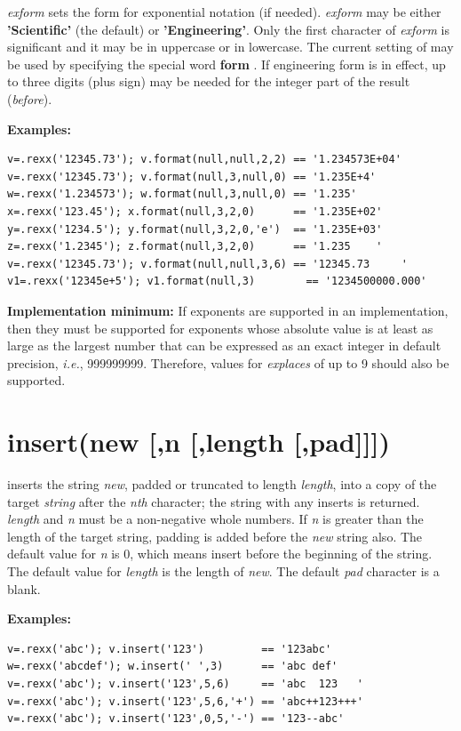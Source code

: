 \emph{exform} sets the form for exponential notation (if needed).
\emph{exform} may be either \textbf{'Scientific'} (the default)
or \textbf{'Engineering'}.  Only the first character of
\emph{exform} is significant and it may be in uppercase or in
lowercase.
The current setting of  may be used by specifying
the special word  \textbf{form} %
.
If engineering form is in effect, up to three digits (plus sign) may be
needed for the integer part of the result (\emph{before}).
 
\textbf{Examples:}
\begin{lstlisting}
v=.rexx('12345.73'); v.format(null,null,2,2) == '1.234573E+04'
v=.rexx('12345.73'); v.format(null,3,null,0) == '1.235E+4'
w=.rexx('1.234573'); w.format(null,3,null,0) == '1.235'
x=.rexx('123.45'); x.format(null,3,2,0)      == '1.235E+02'
y=.rexx('1234.5'); y.format(null,3,2,0,'e')  == '1.235E+03'
z=.rexx('1.2345'); z.format(null,3,2,0)      == '1.235    '
v=.rexx('12345.73'); v.format(null,null,3,6) == '12345.73     '
v1=.rexx('12345e+5'); v1.format(null,3)        == '1234500000.000'
\end{lstlisting}
 \textbf{Implementation minimum:} If exponents are supported in an
implementation, then they must be supported for exponents whose
absolute value is at least as large as the largest number that can be
expressed as an exact integer in default precision, \emph{i.e.}, 999999999.
Therefore, values for \emph{explaces} of up to 9 should also be
supported.
\section{insert(new [,n [,length [,pad{]]]})}\label{refinsert}

inserts the string \emph{new}, padded or truncated to length
\emph{length}, into a copy of the target \emph{string} after the
\emph{n}\emph{th} character; the string with any inserts is returned.
\emph{length} and \emph{n} must be a non-negative whole numbers.
If \emph{n} is greater than the length of the target string,
padding is added before the \emph{new} string also.
The default value for \emph{n} is 0, which means insert before the
beginning of the string.  The default value for \emph{length} is
the length of \emph{new}.  The default \emph{pad} character is
a blank.
 
\textbf{Examples:}
\begin{lstlisting}
v=.rexx('abc'); v.insert('123')         == '123abc'
w=.rexx('abcdef'); w.insert(' ',3)      == 'abc def'
v=.rexx('abc'); v.insert('123',5,6)     == 'abc  123   '
v=.rexx('abc'); v.insert('123',5,6,'+') == 'abc++123+++'
v=.rexx('abc'); v.insert('123',0,5,'-') == '123--abc'
\end{lstlisting}

